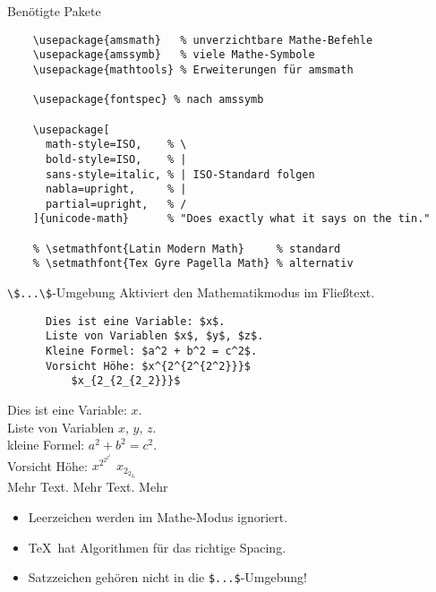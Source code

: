 \begin{frame}[fragile]{
  Benötigte Pakete
  \hfill{}
}
  \begin{lstlisting}
    \usepackage{amsmath}   % unverzichtbare Mathe-Befehle
    \usepackage{amssymb}   % viele Mathe-Symbole
    \usepackage{mathtools} % Erweiterungen für amsmath

    \usepackage{fontspec} % nach amssymb

    \usepackage[
      math-style=ISO,    % \
      bold-style=ISO,    % |
      sans-style=italic, % | ISO-Standard folgen
      nabla=upright,     % |
      partial=upright,   % /
    ]{unicode-math}      % "Does exactly what it says on the tin."

    % \setmathfont{Latin Modern Math}     % standard
    % \setmathfont{Tex Gyre Pagella Math} % alternativ
  \end{lstlisting}
\end{frame}

\begin{frame}[fragile]{\lstinline+\$...\$+-Umgebung}
  Aktiviert den Mathematikmodus im Fließtext.

  \begin{CodeExample}{0.56}
    \begin{lstlisting}
      Dies ist eine Variable: $x$.
      Liste von Variablen $x$, $y$, $z$.
      Kleine Formel: $a^2 + b^2 = c^2$.
      Vorsicht Höhe: $x^{2^{2^{2^2}}}$
          $x_{2_{2_{2_2}}}$
    \end{lstlisting}
  \CodeResult
    Dies ist eine Variable: $x$. \\
    Liste von Variablen $x$, $y$, $z$. \\
    kleine Formel: $a^2 + b^2 = c^2$. \\
    Vorsicht Höhe: $x^{2^{2^{2^2}}}$ $x_{2_{2_{2_2}}}$ \\
    Mehr Text. Mehr Text. Mehr
  \end{CodeExample}

  \vspace{1em}
  \begin{itemize}
    \item Leerzeichen werden im Mathe-Modus ignoriert.
    \item \TeX\ hat Algorithmen für das richtige Spacing.
    \item Satzzeichen gehören nicht in die \lstinline+$...$+-Umgebung!
  \end{itemize}
\end{frame}

